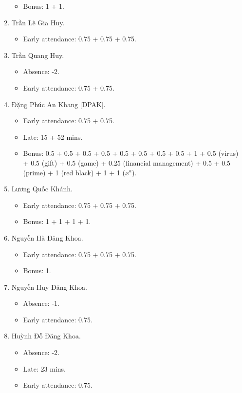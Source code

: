 \documentclass{article}
\begin{document}
\begin{enumerate}
\begin{itemize}
		\item Bonus: 1 + 1.
	\end{itemize}
	\item {\sc Trần Lê Gia Huy.}
	\begin{itemize}
		\item Early attendance: 0.75 + 0.75 + 0.75.
	\end{itemize}
	\item {\sc Trần Quang Huy.}
	\begin{itemize}
		\item Absence: -2.
		\item Early attendance: 0.75 + 0.75.
	\end{itemize}
	\item {\sc Đặng Phúc An Khang [DPAK].}
	\begin{itemize}
		\item Early attendance: 0.75 + 0.75.
		\item Late: 15 + 52 mins.
		\item Bonus: 0.5 + 0.5 + 0.5 + 0.5 + 0.5 + 0.5 + 0.5 + 0.5 + 1 + 0.5 (virus) + 0.5 (gift) + 0.5 (game) + 0.25 (financial management) + 0.5 + 0.5 (prime) + 1 (red black) + 1 + 1 ($x^a$).
	\end{itemize}
	\item {\sc Lương Quốc Khánh.}
	\begin{itemize}
		\item Early attendance: 0.75 + 0.75 + 0.75.
		\item Bonus: 1 + 1 + 1 + 1.
	\end{itemize}
	\item {\sc Nguyễn Hà Đăng Khoa}.
	\begin{itemize}
		\item Early attendance: 0.75 + 0.75 + 0.75.
		\item Bonus: 1.
	\end{itemize}
	\item {\sc Nguyễn Huy Đăng Khoa.}
	\begin{itemize}
		\item Absence: -1.
		\item Early attendance: 0.75.
	\end{itemize}
	\item {\sc Huỳnh Đỗ Đăng Khoa.}
	\begin{itemize}
		\item Absence: -2.
		\item Late: 23 mins.
		\item Early attendance: 0.75.
	\end{itemize}

\end{enumerate}
\end{document}
